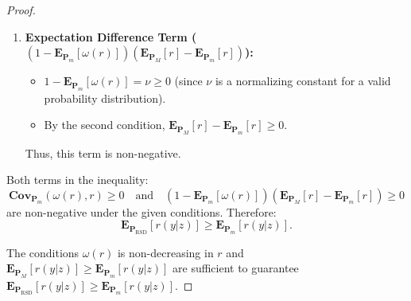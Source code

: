 \documentclass{article}
\theoremstyle{plain}
\theoremstyle{definition}
\theoremstyle{remark}
\begin{document}
\begin{proof}
\begin{enumerate}
    \item \textbf{Expectation Difference Term ($(1 - \mathbf{E}_{\mathbf{P}_m}[\omega(r)]) \left( \mathbf{E}_{\mathbf{P}_M}[r] - \mathbf{E}_{\mathbf{P}_m}[r] \right)$):}  
    \begin{itemize}
        \item $1 - \mathbf{E}_{\mathbf{P}_m}[\omega(r)] = \nu \geq 0$ (since $\nu$ is a normalizing constant for a valid probability distribution).  
        \item By the second condition, $\mathbf{E}_{\mathbf{P}_M}[r] - \mathbf{E}_{\mathbf{P}_m}[r] \geq 0$.  
    \end{itemize}
    Thus, this term is non-negative.
\end{enumerate}



Both terms in the inequality:
\[
\mathbf{Cov}_{\mathbf{P}_m}(\omega(r), r) \geq 0 \quad \text{and} \quad (1 - \mathbf{E}_{\mathbf{P}_m}[\omega(r)]) \left( \mathbf{E}_{\mathbf{P}_M}[r] - \mathbf{E}_{\mathbf{P}_m}[r] \right) \geq 0
\]
are non-negative under the given conditions. Therefore:
\[
\mathbf{E}_{\mathbf{P}_{\mathrm{RSD}}}[r(y|z)] \geq \mathbf{E}_{\mathbf{P}_m}[r(y|z)].
\]


The conditions $\omega(r)$ is non-decreasing in $r$ and $\mathbf{E}_{\mathbf{P}_M}[r(y|z)] \geq \mathbf{E}_{\mathbf{P}_m}[r(y|z)]$ are sufficient to guarantee $\mathbf{E}_{\mathbf{P}_{\mathrm{RSD}}}[r(y|z)] \geq \mathbf{E}_{\mathbf{P}_m}[r(y|z)]$.
\end{proof}
\end{document}

